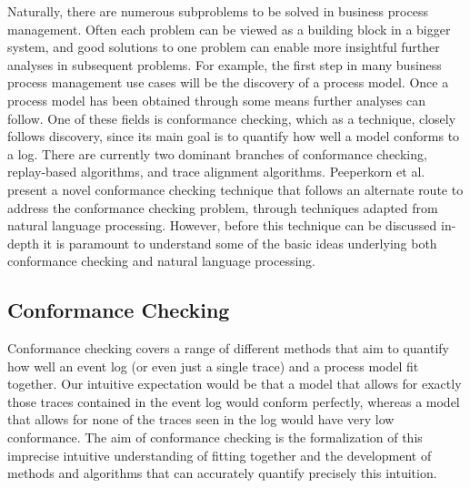 \documentclass[runningheads]{template/llncs}
\begin{document}
Naturally, there are numerous subproblems to be solved in business process management.
Often each problem can be viewed as a building block in a bigger system, and good solutions to one problem can enable more insightful further analyses in subsequent problems.
For example, the first step in many business process management use cases will be the discovery of a process model.
Once a process model has been obtained through some means further analyses can follow.
One of these fields is conformance checking, which as a technique, closely follows discovery, since its main goal is to quantify how well a model conforms to a log.
There are currently two dominant branches of conformance checking, replay-based algorithms, and trace alignment algorithms.
Peeperkorn et al. present a novel conformance checking technique that follows an alternate route \cite{PBWe20} to address the conformance checking problem, through techniques adapted from natural language processing.
However, before this technique can be discussed in-depth it is paramount to understand some of the basic ideas underlying both conformance checking and natural language processing. 


\subsection{Conformance Checking}
\label{sub:conformance}
Conformance checking covers a range of different methods that aim to quantify how well an event log (or even just a single trace) and a process model fit together.
Our intuitive expectation would be that a model that allows for exactly those traces contained in the event log would conform perfectly, whereas a model that allows for none of the traces seen in the log would have very low conformance.
The aim of conformance checking is the formalization of this imprecise intuitive understanding of fitting together and the development of methods and algorithms that can accurately quantify precisely this intuition.
\end{document}
